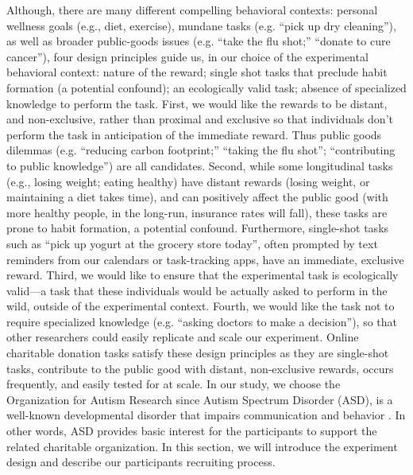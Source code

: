 Although, there are many different compelling behavioral contexts: personal wellness goals (e.g., diet, exercise), mundane tasks (e.g. ``pick up dry cleaning''), as well as broader public-goods issues (e.g. ``take the flu shot;'' ``donate to cure cancer''), four design principles guide us, in our choice of the experimental behavioral context: nature of the reward; single shot tasks that preclude habit formation (a potential confound); an ecologically valid task; absence of specialized knowledge to perform the task. First, we would like the rewards to be distant, and non-exclusive, rather than proximal and exclusive so that individuals don't perform the task in anticipation of the immediate reward. Thus public goods dilemmas (e.g. ``reducing carbon footprint;'' ``taking the flu shot''; ``contributing to public knowledge'') are all candidates. Second, while some longitudinal tasks (e.g., losing weight; eating healthy) have distant rewards (losing weight, or maintaining a diet takes time), and can positively affect the public good (with more healthy people, in the long-run, insurance rates will fall), these tasks are prone to habit formation, a potential confound. Furthermore, single-shot tasks such as ``pick up yogurt at the grocery store today'', often prompted by text reminders from our calendars or task-tracking apps, have an immediate, exclusive reward. Third, we would like to ensure that the experimental task is ecologically valid---a task that these individuals would be actually asked to perform in the wild, outside of the experimental context. Fourth, we would like the task not to require specialized knowledge (e.g. ``asking doctors to make a decision''), so that other researchers could easily replicate and scale our experiment. Online charitable donation tasks satisfy these design principles as they are single-shot tasks, contribute to the public good with distant, non-exclusive rewards, occurs frequently, and easily tested for at scale. In our study, we choose the Organization for Autism Research since Autism Spectrum Disorder (ASD), is a well-known developmental disorder that impairs communication and behavior \cite{american2013diagnostic}. In other words, ASD provides basic interest for the participants to support the related charitable organization. In this section, we will introduce the experiment design and describe our participants recruiting process.






